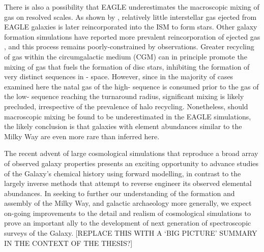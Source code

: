 There is also a possibility that EAGLE underestimates the macroscopic mixing of gas on resolved scales. As shown by \citet{2016arXiv160406803C}, relatively little interstellar gas ejected from EAGLE galaxies is later reincorporated into the ISM to form stars. Other galaxy formation simulations have reported more prevalent reincorporation of ejected gas \citep[see, e.g.][]{2017MNRAS.470.4698A}, and this process remains poorly-constrained by observations. Greater recycling of gas within the circumgalactic medium (CGM) can in principle promote the mixing of gas that fuels the formation of disc stars, inhibiting the formation of very distinct sequences in \afe{}-\feh{} space. However, since in the majority of cases examined here the natal gas of the high-\afe{} sequence is consumed prior to the gas of the low-\afe{} sequence reaching the turnaround radius, significant mixing is likely precluded, irrespective of the prevalence of halo recycling. Nonetheless, should macroscopic mixing be found to be underestimated in the EAGLE simulations, the likely conclusion is that galaxies with element abundances similar to the Milky Way are even more rare than inferred here.

{\red The recent advent of large cosmological simulations that reproduce a broad array of observed galaxy properties presents an exciting opportunity to advance studies of the Galaxy's chemical history using forward modelling, in contrast to the largely inverse methods that attempt to reverse engineer its observed elemental abundances. In seeking to further our understanding of the formation and assembly of the Milky Way, and galactic archaeology more generally, we expect on-going improvements to the detail and realism of cosmological simulations to prove an important ally to the development of next generation of spectroscopic surveys of the Galaxy. [REPLACE THIS WITH A `BIG PICTURE' SUMMARY IN THE CONTEXT OF THE THESIS?]}

